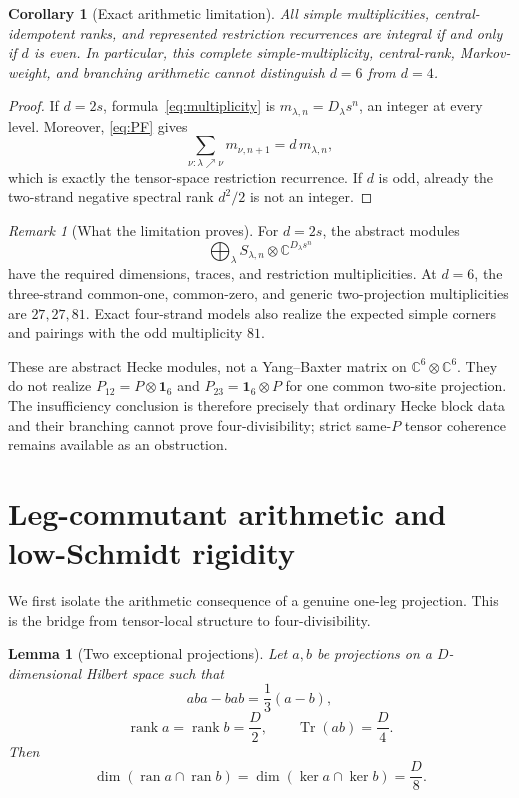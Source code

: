 \documentclass[11pt]{article}
\newtheorem{lemma}[theorem]{Lemma}
\newtheorem{corollary}[theorem]{Corollary}
\theoremstyle{definition}
\theoremstyle{remark}
\newtheorem{remark}[theorem]{Remark}
\newcommand{\Id}{\mathbf 1}
\newcommand{\Tr}{\operatorname{Tr}}
\newcommand{\rank}{\operatorname{rank}}
\newcommand{\bbC}{\mathbb C}
\begin{document}
\begin{corollary}[Exact arithmetic limitation]\label{cor:tower-limitation}
All simple multiplicities, central-idempotent ranks, and represented
restriction recurrences are integral if and only if \(d\) is even. In
particular, this complete simple-multiplicity, central-rank, Markov-weight,
and branching arithmetic cannot distinguish \(d=6\) from \(d=4\).
\end{corollary}

\begin{proof}
If \(d=2s\), formula~\eqref{eq:multiplicity} is
\(m_{\lambda,n}=D_\lambda s^n\), an integer at every level. Moreover,
\eqref{eq:PF} gives
\[
  \sum_{\nu:\lambda\nearrow\nu}m_{\nu,n+1}
  =d\,m_{\lambda,n},
\]
which is exactly the tensor-space restriction recurrence. If \(d\) is
odd, already the two-strand negative spectral rank \(d^2/2\) is not an
integer.
\end{proof}

\begin{remark}[What the limitation proves]\label{rem:abstract-only}
For \(d=2s\), the abstract modules
\[
  \bigoplus_\lambda
  S_{\lambda,n}\otimes\bbC^{D_\lambda s^n}
\]
have the required dimensions, traces, and restriction multiplicities.
At \(d=6\), the three-strand common-one, common-zero, and generic
two-projection multiplicities are \(27,27,81\). Exact four-strand models
also realize the expected simple corners and pairings with the odd
multiplicity \(81\).

These are abstract Hecke modules, not a Yang--Baxter matrix on
\(\bbC^6\otimes\bbC^6\). They do not realize
\(P_{12}=P\otimes\Id_6\) and \(P_{23}=\Id_6\otimes P\) for one common
two-site projection. The insufficiency conclusion is therefore precisely
that ordinary Hecke block data and their branching cannot prove
four-divisibility; strict same-\(P\) tensor coherence remains available as
an obstruction.
\end{remark}

\section{Leg-commutant arithmetic and low-Schmidt rigidity}
\label{sec:low-osr}

We first isolate the arithmetic consequence of a genuine one-leg
projection. This is the bridge from tensor-local structure to
four-divisibility.

\begin{lemma}[Two exceptional projections]\label{lem:two-projections}
Let \(a,b\) be projections on a \(D\)-dimensional Hilbert space such that
\[
  aba-bab=\frac13(a-b),
\]
\[
  \rank a=\rank b=\frac D2,\qquad
  \Tr(ab)=\frac D4.
\]
Then
\[
 \dim(\operatorname{ran}a\cap\operatorname{ran}b)
 =
 \dim(\ker a\cap\ker b)
 =\frac D8.
\]
\end{lemma}
\end{document}
